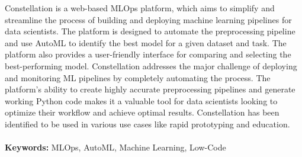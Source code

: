 \documentclass[12pt,a4paper]{report}     %
\begin{document}
		\begin{normalsize}
{\setlength{\baselineskip}{1.1\baselineskip}   %
\noindent %
Constellation is a web-based MLOps platform, which aims to simplify and streamline the process of building and deploying machine learning pipelines for data scientists. The platform is designed to automate the preprocessing pipeline and use AutoML to identify the best model for a given dataset and task. The platform also provides a user-friendly interface for comparing and selecting the best-performing model. Constellation addresses the major challenge of deploying and monitoring ML pipelines by completely automating the process. The platform's ability to create highly accurate preprocessing pipelines and generate working Python code makes it a valuable tool for data scientists looking to optimize their workflow and achieve optimal results. Constellation has been identified to be used in various use cases like rapid prototyping and education.\\\\ 
\textbf{Keywords:} %
MLOps, AutoML, Machine Learning, Low-Code\\\\
\par}
		\end{normalsize}
\newpage

\thispagestyle{empty}
\fancyhead{}
\renewcommand{\headrulewidth}{0pt}
\end{document}
